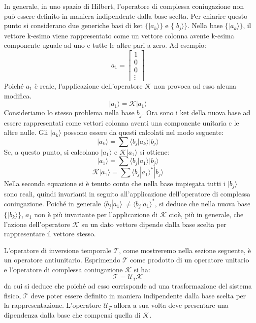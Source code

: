 In generale, in uno spazio di Hilbert, l'operatore di complessa coniugazione non può essere definito in maniera indipendente dalla base scelta.
Per chiarire questo punto si considerano due generiche basi di ket $\{|a_k \rangle \}$ e $\{|b_j \rangle \}$.
Nella base $\{|a_k \rangle \}$, il vettore k-esimo viene rappresentato come un vettore colonna avente k-esima componente uguale ad uno e tutte 
le altre pari a zero. Ad esempio:
\begin{equation}
a_1 =
   \begin{bmatrix}
 1\\
 0\\
 0\\
\vdots
\end{bmatrix}
\end{equation}
Poiché $a_1$ è reale, l'applicazione dell'operatore $\mathscr{K}$ non provoca ad esso alcuna modifica.
\begin{equation}
|a_1 \rangle = \mathscr{K}|a_1\rangle
\end{equation}
Consideriamo lo stesso problema nella base {$b_j$}. Ora sono i ket della nuova base ad essere rappresentati come vettori colonna
aventi una componente unitaria e le altre nulle. Gli $|a_k\rangle$ possono essere da questi calcolati nel modo seguente:
\begin {equation}
|a_k \rangle= \sum {\langle b_j | a_k \rangle |b_j\rangle}
\end {equation}
Se, a questo punto, si calcolano $|a_1\rangle$ e
$\mathscr{K}|a_1\rangle$ si ottiene:
\begin{equation}
|a_1 \rangle= \sum {\langle b_j | a_1 \rangle |b_j\rangle}
\end{equation}
\begin{equation}
\mathscr{K}|a_1 \rangle= \sum {\langle b_j | a_1 \rangle^*|b_j\rangle}
\end{equation}
Nella seconda equazione si è tenuto conto che nella base impiegata tutti i $|b_j\rangle$ sono reali, quindi invarianti in seguito
all'applicazione dell'operatore di complessa coniugazione. Poiché in generale $\langle b_j | a_1 \rangle \ \neq \langle b_j | a_1
\rangle^*$, si deduce che nella nuova base $\{ |b_k\rangle \}$, $a_1$ non è più invariante per l'applicazione di $\mathscr{K}$
cioè, più in generale, che l'azione dell'operatore $\mathscr{K}$ su un dato vettore dipende dalla base scelta per rappresentare il vettore stesso.

L'operatore di inversione temporale $\mathscr{T}$, come mostreremo nella sezione seguente, è un operatore antiunitario.  Esprimendo $\mathscr{T}$ come prodotto di un operatore unitario e l'operatore di complessa coniugazione $\mathscr{K}$ si ha:
\begin{equation}
 \mathscr{T} = \mathscr{U}_T\mathscr{K}
\end{equation}
da cui si deduce che poich\'e ad esso corrisponde ad una trasformazione del sistema fisico, $\mathscr{T}$ deve poter essere definito in maniera indipendente dalla base scelta per la rappresentazione. L'operatore $\mathscr{U}_T$ 
allora a sua volta deve presentare una dipendenza dalla base che compensi quella di $\mathscr{K}$\cite{Branco}.
%
